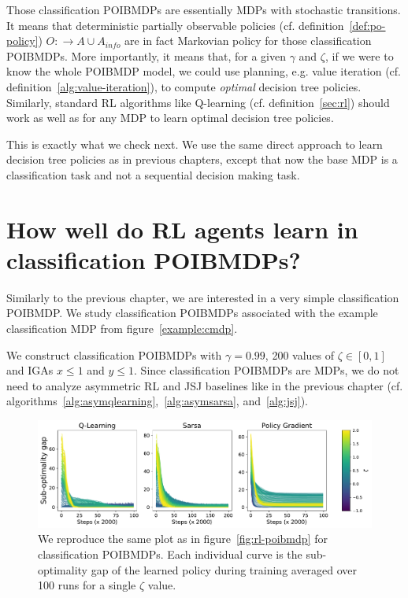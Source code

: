 Those classification POIBMDPs are essentially MDPs with stochastic transitions.
It means that deterministic partially observable policies (cf. definition~\ref{def:po-policy}) $O:\rightarrow A\cup A_{info}$ are in fact Markovian policy for those classification POIBMDPs.
More importantly, it means that, for a given $\gamma$ and $\zeta$, if we were to know the whole POIBMDP model, we could use planning, e.g. value iteration (cf. definition~\ref{alg:value-iteration}), to compute \textit{optimal} decision tree policies.
Similarly, standard RL algorithms like Q-learning (cf. definition~\ref{sec:rl}) should work as well as for any MDP to learn optimal decision tree policies.

This is exactly what we check next.
We use the same direct approach to learn decision tree policies as in previous chapters, except that now the base MDP is a classification task and not a sequential decision making task.

\section{How well do RL agents learn in classification POIBMDPs?}
Similarly to the previous chapter, we are interested in a very simple classification POIBMDP.
We study classification POIBMDPs associated with the example classification MDP from figure~\ref{example:cmdp}.

We construct classification POIBMDPs with $\gamma=0.99$, 200 values of $\zeta \in [0,1]$ and IGAs $x\leq 1$ and $y\leq 1$.
Since classification POIBMDPs are MDPs, we do not need to analyze asymmetric RL and JSJ baselines like in the previous chapter (cf. algorithms~\ref{alg:asymqlearning},~\ref{alg:asymsarsa}, and~\ref{alg:jsj}).

\begin{figure}
    \centering
    \includegraphics[width=1\textwidth]{images/images_part1/learning_curves_classif.pdf}
    \caption{We reproduce the same plot as in figure~\ref{fig:rl-poibmdp} for classification POIBMDPs. Each individual curve is the sub-optimality gap of the learned policy during training averaged over 100 runs for a single $\zeta$ value.}\label{fig:rl-classif-poibmdp}
\end{figure}

